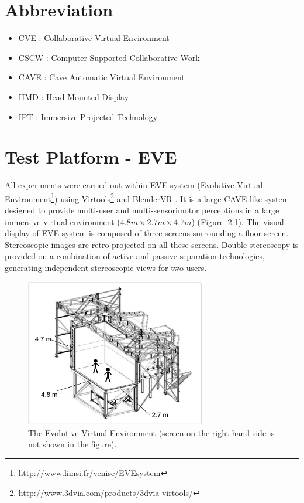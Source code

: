 \begin{appendices}
\appendixpage
\noappendicestocpagenum
\addappheadtotoc

\chapter{Abbreviation}
\label{appendix:abbreviation}
\begin{multicols}{2}
\begin{itemize}
	\item CVE : Collaborative Virtual Environment
	\item CSCW : Computer Supported Collaborative Work
	\item CAVE : Cave Automatic Virtual Environment
	\item HMD : Head Mounted Display
	\item IPT : Immersive Projected Technology
\end{itemize}
\end{multicols}

\chapter{Test Platform - EVE}
\label{appendix:platform}
All experiments were carried out within EVE system (Evolutive Virtual Environment\footnote{http://www.limsi.fr/venise/EVEsystem}) using Virtools\footnote{http://www.3dvia.com/products/3dvia-virtools/} and BlenderVR \citep{BlenderVR2015}. It is a large CAVE-like system designed to provide multi-user and multi-sensorimotor perceptions in a large immersive virtual environment ($4.8m\times2.7m\times4.7m$) (Figure~\ref{fig:EVE}). The visual display of EVE system is composed of three screens surrounding a floor screen. Stereoscopic images are retro-projected on all these screens. Double-stereoscopy is provided on a combination of active and passive separation technologies, generating independent stereoscopic views for two users.

\begin{figure}[tb]
  \centering
  \includegraphics[width=0.7\textwidth]{figures/EVE}
  \caption{\label{fig:EVE}The Evolutive Virtual Environment (screen on the right-hand side is not shown in the figure).}
\end{figure}


\end{appendices}
